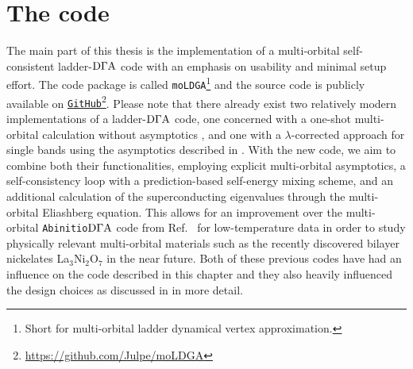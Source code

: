 \documentclass[../../main.tex]{subfiles}
\begin{document}
\sloppy

\chapter{The code}\label{ch:the_code}

The main part of this thesis is the implementation of a multi-orbital self-consistent ladder-$\text{D}\Gamma\text{A}$ code with an emphasis on usability and minimal setup effort. The code package is called \texttt{moLDGA}\footnote{Short for multi-orbital ladder dynamical vertex approximation.} and the source code is publicly available on \href{https://github.com/Julpe/moLDGA}{\texttt{GitHub}}\footnote{\url{https://github.com/Julpe/moLDGA}}. Please note that there already exist two relatively modern implementations of a ladder-$\text{D}\Gamma\text{A}$ code, one concerned with a one-shot multi-orbital calculation without asymptotics \cite{Galler2019}, and one with a $\lambda$-corrected approach for single bands using the  asymptotics described in  \cite{Worm2023}. With the new code, we aim to combine both their functionalities, employing explicit multi-orbital asymptotics, a self-consistency loop with a prediction-based self-energy mixing scheme, and an additional calculation of the superconducting eigenvalues through the multi-orbital Eliashberg equation. This allows for an improvement over the multi-orbital \texttt{Abinitio$\text{D}\Gamma\text{A}$} code from Ref.~\cite{Galler2019} for low-temperature data in order to study physically relevant multi-orbital materials such as the recently discovered bilayer nickelates La$_3$Ni$_2$O$_7$ in the near future. Both of these previous codes have had an influence on the code described in this chapter and they also heavily influenced the design choices as discussed in  in more detail.
\end{document}
